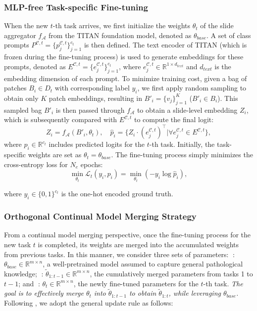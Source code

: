 \documentclass[10pt,twocolumn,letterpaper]{article}
\begin{document}
\subsubsection{MLP-free Task-specific Fine-tuning}\label{sec:mlp-free} When the new $t$-th task arrives, we first initialize the weights $\theta_t$ of the slide aggregator $f_{\mathcal{A}}$ from the TITAN foundation model, denoted as $\theta_{{base}}$. A set of class prompts $P^{\mathcal{C},t} = \{p^{\mathcal{C},t}_j\}_{j=1}^{c_t}$ is then defined. The text encoder of TITAN {(which is frozen during the fine-tuning process)} is used to generate embeddings for these prompts, denoted as $E^{\mathcal{C},t} = \{e^{\mathcal{C},t}_j\}_{j=1}^{c_t}$, where $e^{\mathcal{C},t}_j \in \mathbb{R}^{1 \times d_{{text}}}$ and $d_{{text}}$ is the embedding dimension of each prompt.
To minimize training cost, given a bag of patches $B_i \in D_t$ with corresponding label $y_i$, we first apply random sampling to obtain only $K$ patch embeddings, resulting in $B'_i = \{v_j\}_{j=1}^K$ ($B'_i \in B_i$). This sampled bag $B'_i$ is then passed through $f_{\mathcal{A}}$ to obtain a slide-level embedding $Z_i$, which is subsequently compared with $E^{\mathcal{C},t}$ to compute the final logit:
\begin{equation}
Z_i = f_{\mathcal{A}}(B'_i, \theta_t), \quad \hat{p}_i = \{Z_i \cdot ({e^{\mathcal{C},t}_j})^\top| \forall e^{\mathcal{C},t}_j \in E^{\mathcal{C},t}\},
\label{eq:1}
\end{equation}
\noindent where $\hat{p}_i \in \mathbb{R}^{c_t}$ includes predicted logits for the $t$-th task. Initially, the task-specific weights are set as $\theta_t = \theta_{{base}}$. The fine-tuning process simply minimizes the cross-entropy loss for $N_e$ epochs:
\begin{equation}
\min_{\theta_t}\mathcal{L}_t (y_i, \hat{p}_i) =  \min_{\theta_t} \left(-y_i \log \hat{p}_i \right),
\label{eq:2}
\end{equation}

\noindent where $y_i \in \{0,1\}^{c_t}$ is the one-hot encoded ground truth.

\noindent\subsubsection{Orthogonal Continual Model Merging Strategy}\label{sec:cmm} From a continual model merging perspective, once the fine-tuning process for the new task $t$ is completed, its weights are merged into the accumulated weights from previous tasks. In this manner, we consider three sets of parameters: \textcircled{}: $\theta_{{base}} \in \mathbb{R}^{m\times n}$, a well-pretrained model assumed to capture general pathological knowledge; \textcircled{}: $\tilde{\theta}_{1:t-1} \in \mathbb{R}^{m\times n}$, the cumulatively merged parameters from tasks 1 to $t{-}1$; and \textcircled{}: $\theta_t \in \mathbb{R}^{m\times n}$, the newly fine-tuned parameters for the $t$-th task. \textit{The goal is to effectively merge $\theta_t$ into $\tilde{\theta}_{1:t-1}$ to obtain $\tilde{\theta}_{1:t}$, while leveraging $\theta_{{base}}$.} Following \cite{ilharco2022editing,tang2025merging}, we adopt the general update rule as follows:
\end{document}
